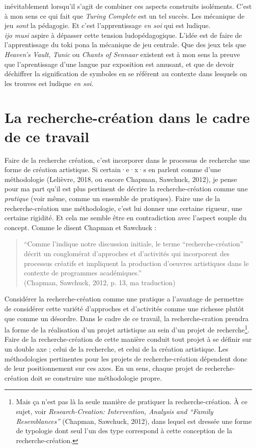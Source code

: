 \documentclass{scrartcl}
\begin{document}
inévitablement lorsqu'il s'agit de combiner ces aspects construits isoléments. C'est à mon sens ce qui fait que \textit{Turing Complete} est un tel succès. Les mécanique de jeu \textit{sont} la pédagogie. Et c'est l'apprentissage \textit{en soi} qui est ludique.\\
		
		\textit{ijo musi} aspire à dépasser cette tension ludopédagogique. L'idée est de faire de l'apprentissage du toki pona la mécanique de jeu centrale. Que des jeux tels que \textit{Heaven's Vault}, \textit{Tunic} ou \textit{Chants of Sennaar} existent est à mon sens la preuve que l'aprentissage d'une langue par exposition est amusant, et que de devoir déchiffrer la signification de symboles en se référent au contexte dans lesquels on les trouves est ludique \textit{en soi}.
	
	
	\section{La recherche-création dans le cadre de ce travail}
	Faire de la recherche création, c'est incorporer dans le processus de recherche une forme de création artistique. Si certain·e·x·s en parlent comme d'une méthodologie (Lelièvre, 2018, ou encore Chapman, Sawchuck, 2012), je pense pour ma part qu'il est plus pertinent de décrire la recherche-création comme une \textit{pratique} (voir même, comme un ensemble de pratiques). Faire une de la recherche-création une méthodologie, c'est lui donner une certaine rigueur, une certaine rigidité. Et cela me semble être en contradiction avec l'aspect souple du concept. Comme le disent Chapman et Sawchuck :
	\begin{quote}
		“Comme l'indique notre discussion initiale, le terme “recherche-création” décrit un conglomérat d'approches et d'activités qui incorporent des processus créatifs et impliquent la production d'oeuvres artistiques dans le contexte de programmes académiques.”\\
		(Chapman, Sawchuck, 2012, p. 13, ma traduction)
	\end{quote}
	Considérer la recherche-création comme une pratique a l'avantage de permettre de considérer cette variété d'approches et d'activités comme une richesse plutôt que comme un désordre. Dans le cadre de ce travail, la recherche-cration prendra la forme de la réalisation d'un projet artistique au sein d'un projet de recherche\footnote{Mais ça n'est pas là la seule manière de pratiquer la recherche-création. À ce sujet, voir \textit{Research-Creation: Intervention, Analysis and “Family Resemblances”} (Chapman, Sawchuck, 2012), dans lequel est dressée une forme de typologie dont seul l'un des type correspond à cette conception de la recherche-création.}. Faire de la recherche-création de cette manière conduit tout projet à se définir sur un double axe ; celui de la recherche, et celui de la création artistique. Les méthodologies pertinentes pour les projets de recherche-création dépendent donc de leur positionnement sur ces axes. En un sens, chaque projet de recherche-création doit se construire une méthodologie propre.\\
	
\end{document}
